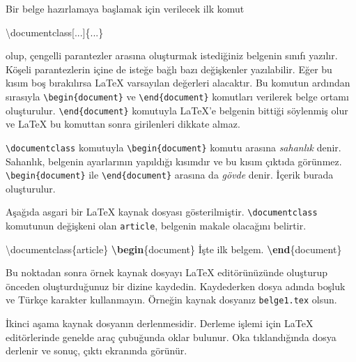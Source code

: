 \documentclass[
  10pt,
]{scrbook}
\newenvironment{Shaded}{\begin{snugshade}}{\end{snugshade}}
\newcommand{\BuiltInTok}[1]{#1}
\newcommand{\ExtensionTok}[1]{#1}
\newcommand{\KeywordTok}[1]{\textcolor[rgb]{0.13,0.29,0.53}{\textbf{#1}}}
\newcommand{\NormalTok}[1]{#1}
\theoremstyle{definition}
\theoremstyle{definition}
\theoremstyle{definition}
\theoremstyle{definition}
\theoremstyle{remark}
\begin{document}
Bir belge hazırlamaya başlamak için verilecek ilk komut

\begin{Shaded}
\begin{Highlighting}[]
\BuiltInTok{\textbackslash{}documentclass}\NormalTok{[...]\{}\ExtensionTok{...}\NormalTok{\}}
\end{Highlighting}
\end{Shaded}

olup, çengelli parantezler arasına oluşturmak istediğiniz belgenin
sınıfı yazılır. Köşeli parantezlerin içine de isteğe bağlı bazı
değişkenler yazılabilir. Eğer bu kısım boş bırakılırsa LaTeX varsayılan
değerleri alacaktır. Bu komutun ardından sırasıyla \texttt{\textbackslash{}begin\{document\}} ve
\texttt{\textbackslash{}end\{document\}} komutları verilerek belge ortamı oluşturulur.
\texttt{\textbackslash{}end\{document\}} komutuyla LaTeX'e belgenin bittiği söylenmiş olur ve
LaTeX bu komuttan sonra girilenleri dikkate almaz.

\texttt{\textbackslash{}documentclass} komutuyla \texttt{\textbackslash{}begin\{document\}} komutu arasına \emph{sahanlık}
denir. Sahanlık, belgenin ayarlarının yapıldığı kısımdır ve bu kısım
çıktıda görünmez. \texttt{\textbackslash{}begin\{document\}} ile \texttt{\textbackslash{}end\{document\}} arasına da
\emph{gövde} denir. İçerik burada oluşturulur.

Aşağıda asgari bir LaTeX kaynak dosyası gösterilmiştir. \texttt{\textbackslash{}documentclass}
komutunun değişkeni olan \texttt{article}, belgenin makale olacağını belirtir.

\begin{Shaded}
\begin{Highlighting}[]
\BuiltInTok{\textbackslash{}documentclass}\NormalTok{\{}\ExtensionTok{article}\NormalTok{\}}
\KeywordTok{\textbackslash{}begin}\NormalTok{\{}\ExtensionTok{document}\NormalTok{\}}
\NormalTok{  İşte ilk belgem.}
\KeywordTok{\textbackslash{}end}\NormalTok{\{}\ExtensionTok{document}\NormalTok{\}}
\end{Highlighting}
\end{Shaded}

Bu noktadan sonra örnek kaynak dosyayı LaTeX editörünüzünde oluşturup
önceden oluşturduğunuz bir dizine kaydedin. Kaydederken dosya adında
boşluk ve Türkçe karakter kullanmayın. Örneğin kaynak dosyanız
\texttt{belge1.tex} olsun.

İkinci aşama kaynak dosyanın derlenmesidir. Derleme işlemi için LaTeX
editörlerinde genelde araç çubuğunda oklar bulunur. Oka tıklandığında
dosya derlenir ve sonuç, çıktı ekranında görünür.
\end{document}
